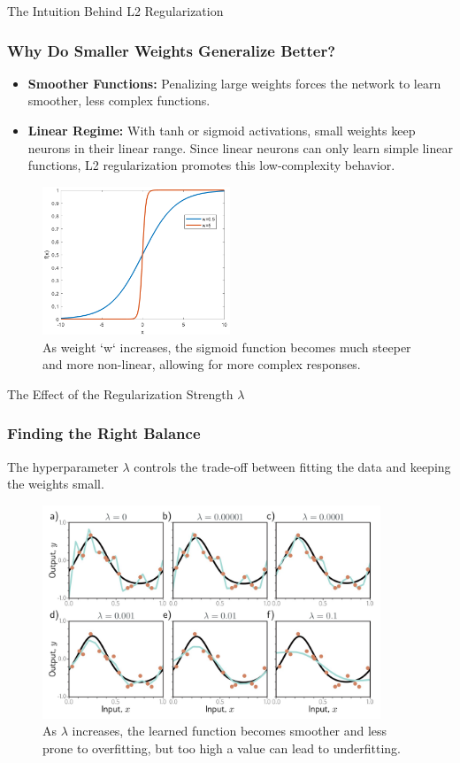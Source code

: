 \begin{frame}{The Intuition Behind L2 Regularization}
    \frametitle{Why Do Smaller Weights Generalize Better?}
    \begin{itemize}
        \item \textbf{Smoother Functions:} Penalizing large weights forces the network to learn smoother, less complex functions.
        \item \textbf{Linear Regime:} With tanh or sigmoid activations, small weights keep neurons in their linear range. Since linear neurons can only learn simple linear functions, L2 regularization promotes this low-complexity behavior.
    \end{itemize}
    \begin{figure}
        \includegraphics[width=0.5\textwidth]{images/sigmoid_l2.png}
        \caption{As weight `w` increases, the sigmoid function becomes much steeper and more non-linear, allowing for more complex responses.}
    \end{figure}
\end{frame}

\begin{frame}{The Effect of the Regularization Strength $\lambda$}
    \frametitle{Finding the Right Balance}
    The hyperparameter $\lambda$ controls the trade-off between fitting the data and keeping the weights small.
    \begin{figure}
        \includegraphics[width=0.9\textwidth]{images/lambda_effect.png}
        \caption{As $\lambda$ increases, the learned function becomes smoother and less prone to overfitting, but too high a value can lead to underfitting.}
    \end{figure}
\end{frame}

